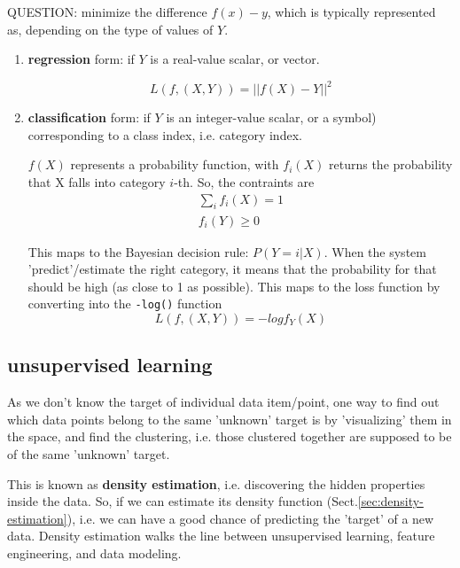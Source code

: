 QUESTION: minimize the difference $f(x)-y$, which is typically represented as,
depending on the type of values of $Y$.
\begin{enumerate}
  \item {\bf regression} form: if $Y$ is a real-value scalar, or vector.
  
  \begin{equation}
L(f,(X,Y)) = ||f(X)-Y||^2
\end{equation}
  
  
  \item {\bf classification} form: if $Y$ is an integer-value scalar, or a
  symbol) corresponding to a class index, i.e. category index.
  
 $f(X)$ represents a probability function, with $f_i(X)$ returns the probability
 that X falls into category $i$-th. So, the contraints are
 \begin{equation}
 \begin{split}
 \sum_i f_i(X) = 1 \\
 f_i(Y) \ge 0
 \end{split}
 \end{equation}
  
 This maps to the Bayesian decision rule: $P(Y=i | X)$. When the system
 'predict'/estimate the right category, it means that the probability for that
 should be high (as close to 1 as possible). This maps to the loss function by
 converting into the \verb!-log()! function
 \begin{equation}
 L(f, (X,Y)) = -log f_Y(X)
 \end{equation}
  
  
\end{enumerate}




\subsection{unsupervised learning}
\label{sec:unsupervised-learning}

As we don't know the target of individual data item/point, one way to find out
which data points belong to the same 'unknown' target is by 'visualizing' them
in the space, and find the clustering, i.e. those clustered together are
supposed to be of the same 'unknown' target.

This is known as {\bf density estimation}, i.e. discovering the hidden
properties inside the data. So, if we can estimate its density function
(Sect.\ref{sec:density-estimation}), i.e. we can have a good chance of
predicting the 'target' of a new data. Density estimation walks the line between
unsupervised learning, feature engineering, and data modeling.

